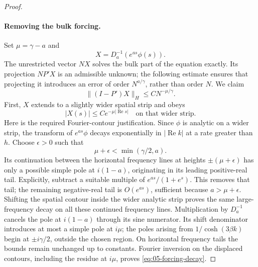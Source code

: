 \begin{proof}
\paragraph{Removing the bulk forcing.}
Set \(\mu=\gamma-a\) and
\[
 X=D_a^{-1}(e^{as}\phi(s)).
\]
The unrestricted vector \(NX\) solves the bulk part of the equation
exactly. Its projection \(NP'X\) is an admissible unknown; the following
estimate ensures that projecting it introduces an error of order
\(N^{a/\gamma}\), rather than order \(N\). We claim
\begin{equation}
 \|(I-P')X\|_H\le C N^{-\mu/\gamma}.
 \label{eq:05-forcing-approximation}
\end{equation}
First, \(X\) extends to a slightly wider spatial strip and obeys
\begin{equation}
 |X(s)|\le C e^{-\mu|\operatorname{Re}s|}
 \quad\text{on that wider strip}.
 \label{eq:05-forcing-decay}
\end{equation}
Here is the required Fourier-contour justification. Since \(\phi\) is analytic on a wider strip, the transform of \(e^{as}\phi\) decays exponentially in \(|\operatorname{Re}k|\) at a rate greater than \(h\). Choose \(\epsilon>0\) such that
\[
 \mu+\epsilon<\min(\gamma/2,a).
\]
Its continuation between the horizontal frequency lines at heights \(\pm(\mu+\epsilon)\) has only a possible simple pole at \(i(1-a)\), originating in its leading positive-real tail. Explicitly, subtract a suitable multiple of \(e^{as}/(1+e^s)\). This removes that tail; the remaining negative-real tail is \(O(e^{as})\), sufficient because \(a>\mu+\epsilon\). Shifting the spatial contour inside the wider analytic strip proves the same large-frequency decay on all these continued frequency lines. Multiplication by \(D_a^{-1}\) cancels the pole at \(i(1-a)\) through its sine numerator. Its shift denominator introduces at most a simple pole at \(i\mu\); the poles arising from \(1/\cosh(3\beta k)\) begin at \(\pm i\gamma/2\), outside the chosen region. On horizontal frequency tails the bounds remain unchanged up to constants. Fourier inversion on the displaced contours, including the residue at \(i\mu\), proves \eqref{eq:05-forcing-decay}.


\end{proof}
